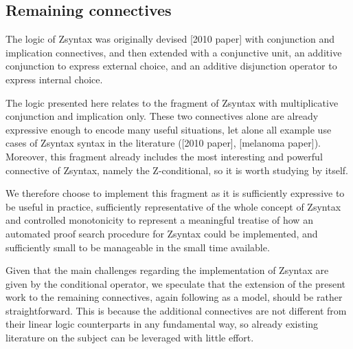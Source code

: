 \subsection{Remaining connectives}

The logic of Zsyntax was originally devised [2010 paper] with conjunction and
implication connectives, and then extended \cite{adding-logic} with a
conjunctive unit, an additive conjunction to express external choice, and an
additive disjunction operator to express internal choice.

The logic presented here relates to the fragment of Zsyntax with multiplicative
conjunction and implication only. These two connectives alone are already
expressive enough to encode many useful situations, let alone all example use
cases of Zsyntax syntax in the literature ([2010 paper], [melanoma
paper]). Moreover, this fragment already includes the most interesting and
powerful connective of Zsyntax, namely the Z-conditional, so it is worth
studying by itself.

We therefore choose to implement this fragment as it is sufficiently expressive
to be useful in practice, sufficiently representative of the whole concept of
Zsyntax and controlled monotonicity to represent a meaningful treatise of how an
automated proof search procedure for Zsyntax could be implemented, and
sufficiently small to be manageable in the small time available.

Given that the main challenges regarding the implementation of Zsyntax are given
by the conditional operator, we speculate that the extension of the present work
to the remaining connectives, again following \cite{chaudhuri-thesis} as a
model, should be rather straightforward. This is because the additional
connectives are not different from their linear logic counterparts in any
fundamental way, so already existing literature on the subject can be leveraged
with little effort.

